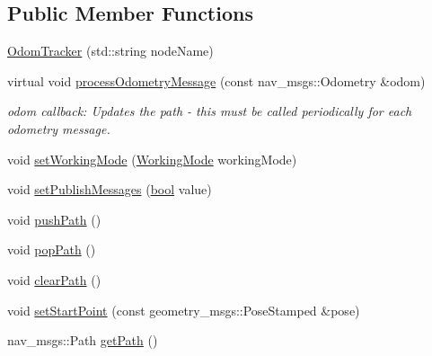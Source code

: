 \subsection*{Public Member Functions}
\begin{DoxyCompactItemize}
\item 
\hyperlink{classmove__base__z__client_1_1odom__tracker_1_1OdomTracker_ab6d1b57e311a9434a95c112e2f62501f}{Odom\+Tracker} (std\+::string node\+Name)
\item 
virtual void \hyperlink{classmove__base__z__client_1_1odom__tracker_1_1OdomTracker_a79b9f1e3b15fa6ac82dd93ab78e23579}{process\+Odometry\+Message} (const nav\+\_\+msgs\+::\+Odometry \&odom)
\begin{DoxyCompactList}\small\item\em odom callback\+: Updates the path -\/ this must be called periodically for each odometry message. \end{DoxyCompactList}\item 
void \hyperlink{classmove__base__z__client_1_1odom__tracker_1_1OdomTracker_aebeb8ff6d1f9375d855def4a33b90731}{set\+Working\+Mode} (\hyperlink{namespacemove__base__z__client_1_1odom__tracker_adf3e5fc3644563922cc64a20a0197224}{Working\+Mode} working\+Mode)
\item 
void \hyperlink{classmove__base__z__client_1_1odom__tracker_1_1OdomTracker_af567cbb995d224a9737ec9080c7d0f09}{set\+Publish\+Messages} (\hyperlink{classbool}{bool} value)
\item 
void \hyperlink{classmove__base__z__client_1_1odom__tracker_1_1OdomTracker_a2166488c9e1cd0fb94fdd963bca80ece}{push\+Path} ()
\item 
void \hyperlink{classmove__base__z__client_1_1odom__tracker_1_1OdomTracker_ad7bc705c10a84b14df4e7d937e4e5f7e}{pop\+Path} ()
\item 
void \hyperlink{classmove__base__z__client_1_1odom__tracker_1_1OdomTracker_ae131b8bd2c3587b12cdc9b22699e8837}{clear\+Path} ()
\item 
void \hyperlink{classmove__base__z__client_1_1odom__tracker_1_1OdomTracker_afa402777496c8d0df39191f40377bd0e}{set\+Start\+Point} (const geometry\+\_\+msgs\+::\+Pose\+Stamped \&pose)
\item 
nav\+\_\+msgs\+::\+Path \hyperlink{classmove__base__z__client_1_1odom__tracker_1_1OdomTracker_ac6fe40f7ad67c80068ac1320e1a3d040}{get\+Path} ()
\end{DoxyCompactItemize}
